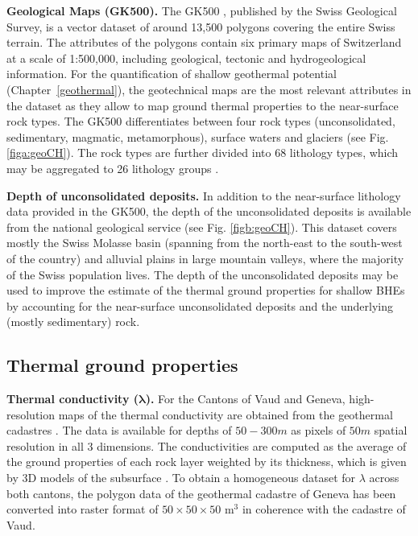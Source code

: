 \textbf{Geological Maps (GK500).} The GK500 \cite{swisstopo_geomaps_nodate}, published by the Swiss Geological Survey, is a vector dataset of around 13,500 polygons covering the entire Swiss terrain.
The attributes of the polygons contain six primary maps of Switzerland at a scale of 1:500,000, including geological, tectonic and hydrogeological information. 
For the quantification of shallow geothermal potential (Chapter~\ref{geothermal}), the geotechnical maps are the most relevant attributes in the dataset as they allow to map ground thermal properties to the near-surface rock types. 
The GK500 differentiates between four rock types (unconsolidated, sedimentary, magmatic, metamorphous), surface waters and glaciers (see Fig. \ref{figa:geoCH}).
The rock types are further divided into 68 lithology types, which may be aggregated to 26 lithology groups \cite{zappone_saphyr_2021}.

\textbf{Depth of unconsolidated deposits.} 
In addition to the near-surface lithology data provided in the GK500, the depth of the unconsolidated deposits is available from the national geological service (see Fig. \ref{figb:geoCH}). This dataset covers mostly the Swiss Molasse basin (spanning from the north-east to the south-west of the country) and alluvial plains in large mountain valleys, where the majority of the Swiss population lives. The depth of the unconsolidated deposits may be used to improve the estimate of the thermal ground properties for shallow BHEs by accounting for the near-surface unconsolidated deposits and the underlying (mostly sedimentary) rock.

\subsection{Thermal ground properties}

\textbf{Thermal conductivity ($\mathbf{\lambda}$).} For the Cantons of Vaud and Geneva, high-resolution maps of the thermal conductivity are obtained from the geothermal cadastres \cite{asit_vd_cadastre_2019-1,sitg_cadastre_2019}. 
The data is available for depths of $50-300m$ as pixels of $50m$ spatial resolution in all 3 dimensions.  
The conductivities are computed as the average of the ground properties of each rock layer weighted by %
its thickness, which is given by 3D models of the subsurface \cite{groupe_de_travail_pgg_evaluation_2011-1}.
To obtain a homogeneous dataset for $\lambda$ across both cantons, the polygon data of the geothermal cadastre of Geneva has been converted into raster format of $50 \times 50 \times 50$ m$^3$ in coherence with the cadastre of Vaud.

